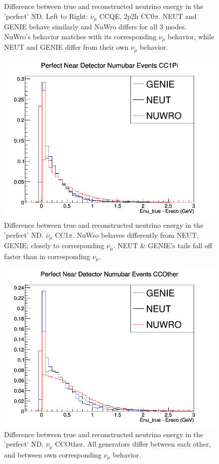 \documentclass[12pt]{article}
\begin{document}
\begin{figure}[h]
\endminipage
\caption{Difference between true and reconstructed neutrino energy in the 'perfect' ND. Left to Right: $\overline{\nu}_\mu$ CCQE, 2p2h CC0$\pi$. NEUT and GENIE behave similarly and NuWro differs for all 3 modes. NuWro's behavior matches with its corresponding $\nu_\mu$ behavior, while NEUT and GENIE differ from their own $\nu_\mu$ behavior.}
\label{fig:numubar_Etrue_ereco_perfect}
\end{figure}
\begin{figure}[h]
\centering
{}
\includegraphics[width=\linewidth]{Ereco_Etrue/numubar_perfect_ND_CC1Pi.png}
\endminipage
\caption{Difference between true and reconstructed neutrino energy in the 'perfect' ND. $\overline{\nu}_\mu$ CC1$\pi$. NuWro behaves differently from NEUT, GENIE; closely to corresponding $\nu_\mu$. NEUT \& GENIE's tails fall off faster than in corresponding $\nu_\mu$.}
\label{fig:numubar_Etrue_ereco_perfect_CC1Pi}
\end{figure}
\begin{figure}[h]
\centering
{}
\includegraphics[width=\linewidth]{Ereco_Etrue/numubar_perfect_ND_CCOther.png}
\endminipage
\caption{Difference between true and reconstructed neutrino energy in the 'perfect' ND. $\overline{\nu}_\mu$ CCOther. All generators differ between each other, and between own corresponding $\nu_\mu$ behavior.}
\label{fig:numubar_Etrue_ereco_perfect_CCOther}
\end{figure}
\end{document}
